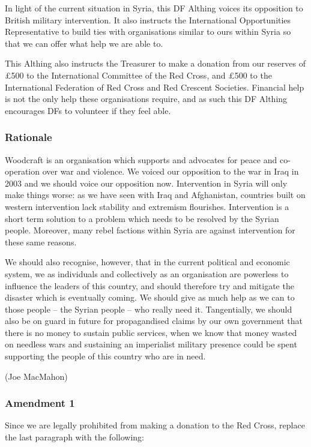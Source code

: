 \documentclass[a4paper, 11pt]{article} %
\begin{document}
In light of the current situation in Syria, this DF Althing voices its opposition to British military intervention.  It also instructs the International Opportunities Representative to build ties with organisations similar to ours within Syria so that we can offer what help we are able to.

This Althing also instructs the Treasurer to make a donation from our reserves of £500 to the International Committee of the Red Cross, and £500 to the International Federation of Red Cross and Red Crescent Societies.  Financial help is not the only help these organisations require, and as such this DF Althing encourages DFs to volunteer if they feel able.

\subsubsection{Rationale}

Woodcraft is an organisation which supports and advocates for peace and co-operation over war and violence.  We voiced our opposition to the war in Iraq in 2003 and we should voice our opposition now.  Intervention in Syria will only make things worse: as we have seen with Iraq and Afghanistan, countries built on western intervention lack stability and extremism flourishes.  Intervention is a short term solution to a problem which needs to be resolved by the Syrian people.  Moreover, many rebel factions within Syria are against intervention for these same reasons.

We should also recognise, however, that in the current political and economic system, we as individuals and collectively as an organisation are powerless to influence the leaders of this country, and should therefore try and mitigate the disaster which is eventually coming.  We should give as much help as we can to those people -- the Syrian people -- who really need it.  Tangentially, we should also be on guard in future for propagandised claims by our own government that there is no money to sustain public services, when we know that money wasted on needless wars and sustaining an imperialist military presence could be spent supporting the people of this country who are in need.

(Joe MacMahon)

\subsubsection{Amendment 1}

Since we are legally prohibited from making a donation to the Red Cross, replace the last paragraph with the following:
\end{document}
